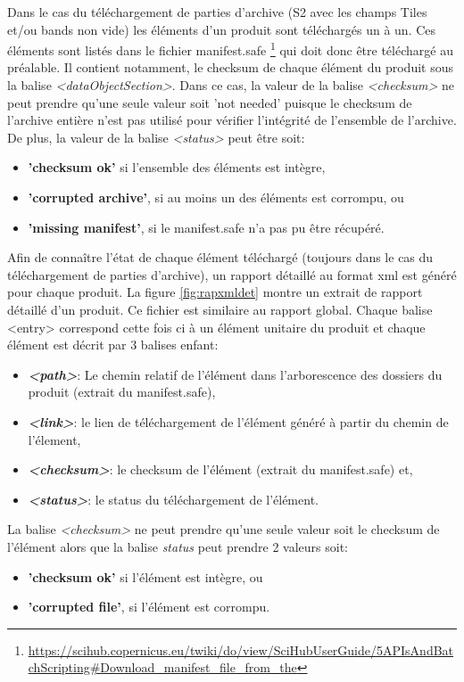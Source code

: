 \documentclass[notitlepage]{report}
\begin{document}
Dans le cas du téléchargement de parties d'archive (S2 avec les champs Tiles et/ou bands non vide) les éléments d'un produit sont téléchargés un à un. Ces éléments sont listés dans le fichier manifest.safe
\footnote{\url{https://scihub.copernicus.eu/twiki/do/view/SciHubUserGuide/5APIsAndBatchScripting\#Download_manifest_file_from_the}} qui doit donc être téléchargé au préalable. Il contient notamment, le checksum de chaque élément du produit sous la balise \emph{<dataObjectSection>}. Dans ce cas, la valeur de la balise \emph{<checksum>} ne peut prendre qu'une seule valeur soit 'not needed' puisque le checksum de l'archive entière n'est pas utilisé pour vérifier l'intégrité de l'ensemble de l'archive.
De plus, la valeur de la balise \emph{<status>} peut être soit:
\begin{itemize}
\item \textbf{'checksum ok'} si l'ensemble des éléments est intègre,
\item \textbf{'corrupted archive'}, si au moins un des éléments est corrompu, ou
\item \textbf{'missing manifest'}, si le manifest.safe n'a pas pu être récupéré.
\end{itemize}

Afin de connaître l'état de chaque élément téléchargé (toujours dans le cas du téléchargement de parties d'archive), un rapport détaillé au format xml est généré pour chaque produit. La figure \ref{fig:rapxmldet} montre un extrait de rapport détaillé d'un produit. Ce fichier est similaire au rapport global. Chaque balise <entry> correspond cette fois ci à un élément unitaire du produit et chaque élément est décrit par 3 balises enfant:
\begin{itemize}
\item \textbf{\emph{<path>}}: Le chemin relatif de l'élément dans l'arborescence des dossiers du produit (extrait du manifest.safe),
\item \textbf{\emph{<link>}}: le lien de téléchargement de l'élément généré à partir du chemin de l'élement,
\item \textbf{\emph{<checksum>}}: le checksum de l'élément (extrait du manifest.safe) et,
\item \textbf{\emph{<status>}}: le status du téléchargement de l’élément.
\end{itemize}
\bigskip

La balise \emph{<checksum>} ne peut prendre qu'une seule valeur soit le checksum de l'élément alors que la balise \emph{status} peut prendre 2 valeurs soit:
\begin{itemize}
\item \textbf{'checksum ok'} si l'élément est intègre, ou
\item \textbf{'corrupted file'}, si l'élément est corrompu.
\end{itemize}
\bigskip
\end{document}
